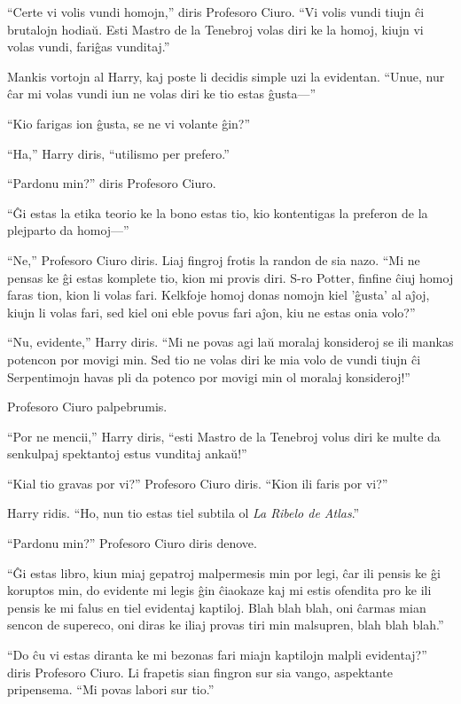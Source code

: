 ``Certe vi volis vundi homojn,'' diris Profesoro Ciuro. ``Vi volis
vundi tiujn ĉi brutalojn hodiaŭ. Esti Mastro de la Tenebroj volas diri
ke la homoj, kiujn vi volas vundi, fariĝas vunditaj.''


Mankis vortojn al Harry, kaj poste li decidis simple uzi la
evidentan. ``Unue, nur ĉar mi volas vundi iun ne volas diri ke tio
estas ĝusta—'' 

``Kio farigas ion ĝusta, se ne vi volante ĝin?''

``Ha,'' Harry diris, ``utilismo per prefero.''

``Pardonu min?'' diris Profesoro Ciuro.

``Ĝi estas la etika teorio ke la bono estas tio, kio kontentigas la preferon de la plejparto da homoj—''

``Ne,'' Profesoro Ciuro diris. Liaj fingroj frotis la randon de sia
nazo. ``Mi ne pensas ke ĝi estas komplete tio, kion mi provis
diri. S-ro Potter, finfine ĉiuj homoj faras tion, kion li volas
fari. Kelkfoje homoj donas nomojn kiel 'ĝusta' al aĵoj, kiujn li volas
fari, sed kiel oni eble povus fari aĵon, kiu ne estas onia volo?''

``Nu, evidente,'' Harry diris. ``Mi ne povas agi laŭ moralaj
konsideroj se ili mankas potencon por movigi min. Sed tio ne volas
diri ke mia volo de vundi tiujn ĉi Serpentimojn havas pli da potenco
por movigi min ol moralaj konsideroj!''

Profesoro Ciuro palpebrumis.

``Por ne mencii,'' Harry diris, ``esti Mastro de la Tenebroj volus
diri ke multe da senkulpaj spektantoj estus vunditaj ankaŭ!''

``Kial tio gravas por vi?'' Profesoro Ciuro diris. ``Kion ili faris por vi?''

Harry ridis. ``Ho, nun tio estas tiel subtila ol \emph{La Ribelo de
Atlas}.''

``Pardonu min?'' Profesoro Ciuro diris denove.

``Ĝi estas libro, kiun miaj gepatroj malpermesis min por legi, ĉar ili
pensis ke ĝi koruptos min, do evidente mi legis ĝin ĉiaokaze kaj mi
estis ofendita pro ke ili pensis ke mi falus en tiel evidentaj
kaptiloj. Blah blah blah, oni ĉarmas mian sencon de supereco, oni
diras ke iliaj provas tiri min malsupren, blah blah blah.''

``Do ĉu vi estas diranta ke mi bezonas fari miajn kaptilojn malpli
evidentaj?'' diris Profesoro Ciuro. Li frapetis sian fingron sur sia
vango, aspektante pripensema. ``Mi povas labori sur tio.''


